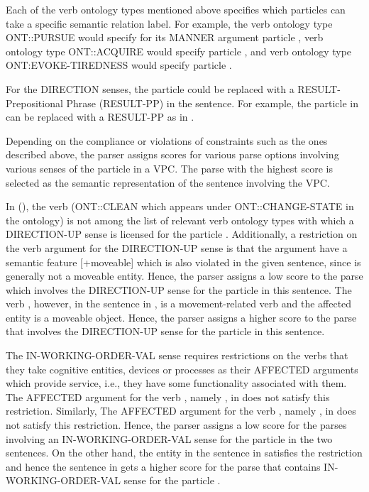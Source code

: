 \documentclass[output=paper,modfonts,nonflat]{langsci/langscibook}
\begin{document}
Each of the verb ontology types mentioned above specifies which particles can take a specific semantic relation label. For example, the verb ontology type ONT::PURSUE would specify for its MANNER argument particle , verb ontology type ONT::ACQUIRE would specify particle , and verb ontology type ONT:EVOKE-TIREDNESS would specify particle .  

For the DIRECTION senses, the particle could be replaced with a RESULT-Pre\-po\-si\-tional Phrase (RESULT-PP) in the sentence. For example, the particle  in  can be replaced with a RESULT-PP  as in .

Depending on the compliance or violations of constraints such as the ones described above, the parser assigns scores for various parse options involving various senses of the particle in a VPC. The parse with the highest score is selected as the semantic representation of the sentence involving the VPC.

In  (), the verb  (ONT::CLEAN which appears under ONT::CHANGE-STATE in the ontology) is not among the list of relevant verb ontology types with which a DIRECTION-UP sense is licensed for the particle . Additionally, a restriction on the verb argument for the DIRECTION-UP sense is that the argument have a semantic feature [+moveable] which is also violated in the given sentence, since  is generally not a moveable entity. Hence, the parser assigns a low score to the parse which involves the DIRECTION-UP sense for the particle  in this sentence. The verb , however, in the sentence in , is a movement-related verb and the affected entity  is a moveable object. Hence, the parser assigns a higher score to the parse that involves the DIRECTION-UP sense for the particle  in this sentence.

The IN-WORKING-ORDER-VAL sense requires restrictions on the verbs that they take cognitive entities, devices or processes as their AFFECTED arguments which provide service, i.e., they have some functionality associated with them. The AFFECTED argument for the verb , namely , in  does not satisfy this restriction. Similarly, The AFFECTED argument for the verb , namely , in  does not satisfy this restriction. Hence, the parser assigns a low score for the parses involving an IN-WORKING-ORDER-VAL sense for the particle  in the two sentences. On the other hand, the entity  in the sentence in  satisfies the restriction and hence the sentence in  gets a higher score for the parse that contains IN-WORKING-ORDER-VAL sense for the particle . 
\end{document}
